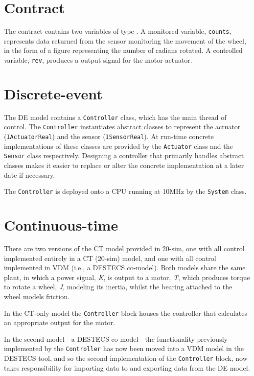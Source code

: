 \section{Contract} The contract contains two variables of type
. A monitored variable, \texttt{counts}, represents data
returned from the sensor monitoring the movement of the wheel, in the
form of a figure representing the number of radians rotated. A
controlled variable, \texttt{rev}, produces a output signal for the
motor actuator.

\section{Discrete-event} The DE model contains a
\texttt{Controller} class, which has the main thread of control.  The
\texttt{Control\-ler} instantiates abstract classes to represent the
actuator (\texttt{IActuatorReal}) and the sensor
(\texttt{ISensorReal}). At run-time concrete implementations of these
classes are provided by the \texttt{Actuator} class and the
\texttt{Sensor} class respectively. Designing a controller that
primarily handles abstract classes makes it easier to replace or alter
the concrete implementation at a later date if necessary.

The \texttt{Controller} is deployed onto a CPU running at 10MHz
by the \texttt{System} class.

\section{Continuous-time} There are two versions of the CT model
provided in 20-sim, one with all control implemented entirely in a CT
(20-sim) model, and one with all control implemented in VDM (i.e., a
DESTECS co-model). Both models share the same plant, in which a power
signal, \emph{K}, is output to a motor, \emph{T}, which produces torque to rotate
a wheel, \emph{J}, modeling its inertia, whilst the bearing attached to the wheel models friction.

In the CT-only model the
\texttt{Controller} block houses the controller that calculates an
appropriate output for the motor. 

In the second model - a DESTECS co-model - the
functionality previously implemented by the \texttt{Controller}
has now been moved into a VDM model in the DESTECS tool, and so the second implementation of the 
\texttt{Controller} block, now takes responsibility for importing data to and exporting data
from the DE model. 

